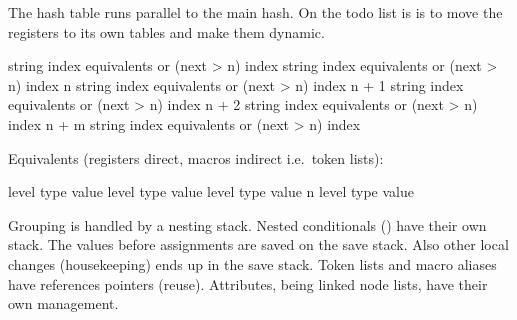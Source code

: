 \stoptitle

\starttitle[title=The hash table (simplified)]

The hash table runs parallel to the main hash. On the todo list is is to move the
registers to its own tables and make them dynamic.

\startlinecorrection[blank]
    \setupTABLE[each][align=middle]
    \setupTABLE[c][1][width=16mm]
    \setupTABLE[c][2][width=64mm]
    \setupTABLE[c][3][width=64mm]
    \bTABLE
        \bTR {}     \eTD \bTD string index \eTD \bTD equivalents or (next > n) index \eTD \eTR
        \bTR {}     \eTD \bTD string index \eTD \bTD equivalents or (next > n) index \eTD \eTR
        \bTR \bTD n     \eTD \bTD string index \eTD \bTD equivalents or (next > n) index \eTD \eTR
        \bTR \bTD n + 1 \eTD \bTD string index \eTD \bTD equivalents or (next > n) index \eTD \eTR
        \bTR \bTD n + 2 \eTD \bTD string index \eTD \bTD equivalents or (next > n) index \eTD \eTR
        \bTR \bTD n + m \eTD \bTD string index \eTD \bTD equivalents or (next > n) index \eTD \eTR
    \eTABLE
\stoplinecorrection

Equivalents (registers direct, macros indirect i.e.\ token lists):

\startlinecorrection[blank]
    \setupTABLE[each][align=middle]
    \setupTABLE[c][1][width=8mm]
    \setupTABLE[c][2][width=32mm]
    \setupTABLE[c][3][width=32mm]
    \setupTABLE[c][4][width=64mm]
    \bTABLE
        \bTR {} \eTD \bTD level \eTD \bTD type \eTD \bTD value \eTD \eTR
        \bTR {} \eTD \bTD level \eTD \bTD type \eTD \bTD value \eTD \eTR
        \bTR {} \eTD \bTD level \eTD \bTD type \eTD \bTD value \eTD \eTR
        \bTR \bTD n \eTD \bTD level \eTD \bTD type \eTD \bTD value \eTD \eTR
    \eTABLE
\stoplinecorrection

\stoptitle

\starttitle[title=Other data management]

\startitemize
\startitem Grouping is handled by a nesting stack. \stopitem
\startitem Nested conditionals () have their own stack. \stopitem
\startitem The values before assignments are saved on the save stack. \stopitem
\startitem Also other local changes (housekeeping) ends up in the save stack. \stopitem
\startitem Token lists and macro aliases have references pointers (reuse). \stopitem
\startitem Attributes, being linked node lists, have their own management. \stopitem
\stopitemize

\stoptitle

\starttitle[title=Example 1: in the input]

